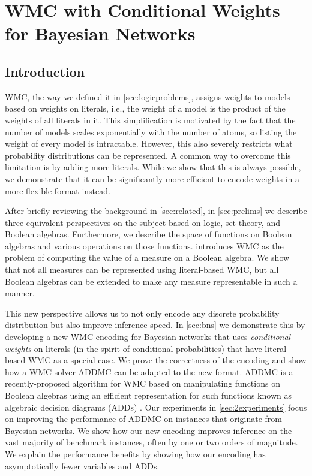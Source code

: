 \chapter{WMC with Conditional Weights for Bayesian Networks}\label{chapter:wmc1}

\section{Introduction}

WMC, the way we defined it in \cref{sec:logicproblems}, assigns weights to
models based on weights on literals, i.e., the weight of a model is the product
of the weights of all literals in it. This simplification is motivated by the
fact that the number of models scales exponentially with the number of atoms, so
listing the weight of every model is intractable. However, this also severely
restricts what probability distributions can be represented. A common way to
overcome this limitation is by adding more literals. While we show that this is
always possible, we demonstrate that it can be significantly more efficient to
encode weights in a more flexible format instead.

After briefly reviewing the background in \cref{sec:related}, in
\cref{sec:prelims} we describe three equivalent perspectives on the subject
based on logic, set theory, and Boolean algebras. Furthermore, we describe the
space of functions on Boolean algebras and various operations on those
functions.  introduces WMC as the problem of computing
the value of a measure on a Boolean algebra. We show that not all measures can
be represented using literal-based WMC, but all Boolean algebras can be extended
to make any measure representable in such a manner.

This new perspective allows us to not only encode any discrete probability
distribution but also improve inference speed. In \cref{sec:bns} we demonstrate
this by developing a new WMC encoding for Bayesian networks that uses
\emph{conditional weights} on literals (in the spirit of conditional
probabilities) that have literal-based WMC as a special case. We prove the
correctness of the encoding and show how a WMC solver \textsc{ADDMC}
\citep{DBLP:conf/aaai/DudekPV20} can be adapted to the new format.
\textsc{ADDMC} is a recently-proposed algorithm for WMC based on manipulating
functions on Boolean algebras using an efficient representation for such
functions known as algebraic decision diagrams (ADDs)
\citep{DBLP:journals/fmsd/BaharFGHMPS97}. Our experiments in
\cref{sec:2experiments} focus on improving the performance of \textsc{ADDMC} on
instances that originate from Bayesian networks. We show how our new encoding
improves inference on the vast majority of benchmark instances, often by one or
two orders of magnitude. We explain the performance benefits by showing how our
encoding has asymptotically fewer variables and ADDs.

